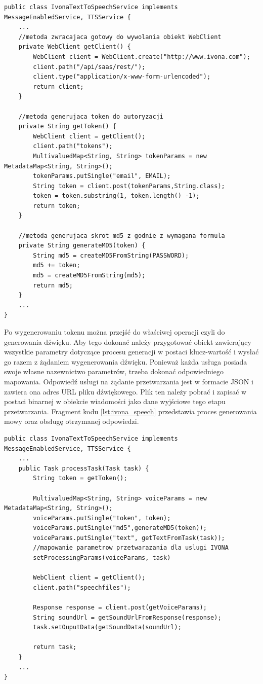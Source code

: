\begin{center}
\begin{lstlisting}
public class IvonaTextToSpeechService implements MessageEnabledService, TTSService {
	...
	//metoda zwracajaca gotowy do wywolania obiekt WebClient
	private WebClient getClient() {
		WebClient client = WebClient.create("http://www.ivona.com");
		client.path("/api/saas/rest/");
		client.type("application/x-www-form-urlencoded");
		return client;
	}

	//metoda generujaca token do autoryzacji
	private String getToken() {
		WebClient client = getClient();
		client.path("tokens");
		MultivaluedMap<String, String> tokenParams = new MetadataMap<String, String>();
		tokenParams.putSingle("email", EMAIL);
		String token = client.post(tokenParams,String.class);
		token = token.substring(1, token.length() -1);
		return token;
	}

	//metoda generujaca skrot md5 z godnie z wymagana formula
	private String generateMD5(token) {
		String md5 = createMD5FromString(PASSWORD);
		md5 += token;
		md5 = createMD5FromString(md5);
		return md5;
	}
	...
}
\end{lstlisting}
\end{center} 

Po wygenerowaniu tokenu można przejść do właściwej operacji czyli do generowania dźwięku. Aby tego dokonać należy przygotować obiekt zawierający wszystkie parametry dotyczące procesu generacji w postaci klucz-wartość i wysłać go razem z żądaniem wygenerowania dźwięku. Ponieważ każda usługa posiada swoje własne nazewnictwo parametrów, trzeba dokonać odpowiedniego mapowania. 
Odpowiedź usługi na żądanie przetwarzania jest w formacie JSON i zawiera ona adres URL pliku dźwiękowego. Plik ten należy pobrać i zapisać w postaci binarnej w obiekcie wiadomości jako dane wyjściowe tego etapu przetwarzania. Fragment kodu \ref{lst:ivona_speech} przedstawia proces generowania mowy oraz obsługę otrzymanej odpowiedzi.

\lstset{language=Java, tabsize=4, caption=Proces generowania tokenu usługi IVONA,label=lst:ivona_speech}

\begin{center}
\begin{lstlisting}
public class IvonaTextToSpeechService implements MessageEnabledService, TTSService {
	...
	public Task processTask(Task task) {
		String token = getToken();

		MultivaluedMap<String, String> voiceParams = new MetadataMap<String, String>();
		voiceParams.putSingle("token", token);
		voiceParams.putSingle("md5",generateMD5(token));
		voiceParams.putSingle("text", getTextFromTask(task));
		//mapowanie parametrow przetwarazania dla uslugi IVONA
		setProcessingParams(voiceParams, task)

		WebClient client = getClient();
		client.path("speechfiles");
	
		Response response = client.post(getVoiceParams);
		String soundUrl = getSoundUrlFromResponse(response);
		task.setOuputData(getSoundData(soundUrl);

		return task;
	}
	...
}
\end{lstlisting}
\end{center} 

